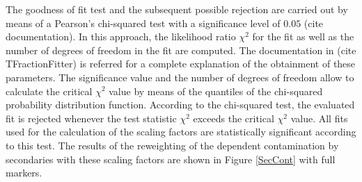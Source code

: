 \documentclass[12pt,a4paper]{report}
\begin{document}
The goodness of fit test and the subsequent possible rejection are carried out by means of a Pearson's chi-squared test with a significance level of $0.05$ (cite documentation). In this approach, the likelihood ratio $\chi^2$ for the fit as well as the number of degrees of freedom in the fit are computed. The documentation in (cite TFractionFitter) is referred for a complete explanation of the obtainment of these parameters. The significance value and the number of degrees of freedom allow to calculate the critical $\chi^2$ value by means of the quantiles of the chi-squared probability distribution function. According to the chi-squared test, the evaluated fit is rejected whenever the test statistic $\chi^2$ exceeds the critical $\chi^2$ value. All fits used for the calculation of the scaling factors are statistically significant according to this test. The results of the reweighting of the \pt dependent contamination by secondaries with these scaling factors are shown in Figure \ref{SecCont} with full markers.
\end{document}
